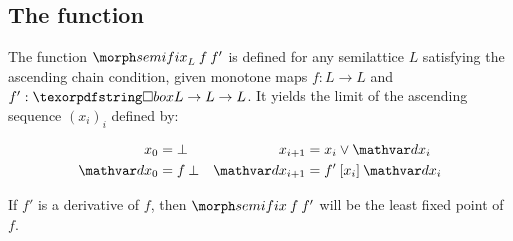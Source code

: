 \documentclass{rntz}
\begin{document}

\subsection{The function \fastfix}

The function $\fastfix_L \<f\<f'$ is defined for any semilattice $L$ satisfying
the ascending chain condition, given monotone maps $f : L \to L$ and $f' : \iso
L \to L \to L$. It yields the limit of the ascending sequence $(x_i)_i$ defined by:

\begin{align*}
  x_0 &= \bot & x_{i+1} &= x_i \vee \dx_i\\
  \dx_0 &= f\<\bot & \dx_{i+1} &= f'\<\ebox{x_i}\<\dx_i
\end{align*}

\noindent
If $f'$ is a derivative of $f$, then $\fastfix\<f\<f'$ will be the least fixed
point of $f$. 


\end{document}

